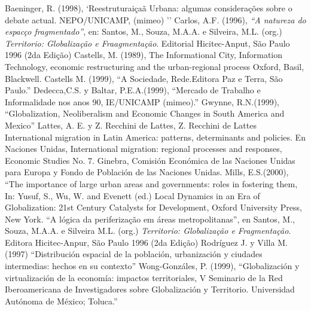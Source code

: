 \begin{thebibliography}{20}

   Baeninger, R. (1998), `Reestruturai\c{c}a\~{a} Urbana: algumas  considera\c{c}\~{o}es  sobre o   debate actual. NEPO/UNICAMP, (mimeo) ''
   Carlos, A.F. (1996), \emph{``A natureza do espac\c{c}o fragmentado''}, en:  Santos, M., Souza, M.A.A. e Silveira, M.L. (org.) \emph{Territorio: Globaliza\c{c}\~{a}o e  Fraagmenta\c{c}\~{a}o}. Editorial Hicitec-Anput, S\~{a}o Paulo 1996 (2da Edi\c{c}\~{a}o)
   Castells, M. (1989), The Informational City, Information Technology,   economic restructuring and the urban-regional process Oxford, Basil,  Blackwell. 
   Castells M. (1999), ``A Sociedade, Rede.Editora Paz e Terra, S\~{a}o  Paulo.'' 
   Dedecca,C.S. y Baltar, P.E.A.(1999), ``Mercado de Trabalho e  Informalidade nos anos 90, IE/UNICAMP   (mimeo).''
   Gwynne, R.N.(1999), ``Globalization, Neoliberalism and Economic Changes in  South America and  Mexico''
  Lattes, A. E. y Z. Recchini de Lattes, Z. Recchini de Lattes
   International migration in Latin America: patterns, determinants and policies. En Naciones   Unidas, International migration: regional processes and responses, Economic Studies No. 7.   Ginebra, Comisión Económica de las Naciones Unidas para   Europa y Fondo de Población de las Naciones Unidas.
   Mills, E.S.(2000), ``The importance of large urban areas and governments:  roles in fostering them, In: Yusuf,   S., Wu, W. and Evenett (ed.) Local Dynamics in an Era of Globalization: 21st Century Catalysts for   Development, Oxford University Press, New York. 
   ``A lógica da periferiza\c{c}\~{a}o em áreas metropolitanas'', en Santos,  M., Souza, M.A.A. e Silveira M.L. (org.) \emph{Territorio: Globaliza\c{c}\~{a}o e  Fragmenta\c{c}\~{a}o}. Editora Hicitec-Anpur, S\~{a}o Paulo 1996 (2da Edi\c{c}\~{a}o)
   Rodríguez J. y Villa M. (1997) ``Distribución espacial de la población,  urbanización y ciudades intermedias: hechos en su contexto''
   Wong-Gonzáles, P. (1999), ``Globalización y virtualización de la economía:  impactos territoriales, V  Seminario de la Red Iberoamericana de Investigadores sobre  Globalización y Territorio. Universidad  Autónoma de México; Toluca.''



\end{thebibliography}
